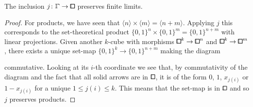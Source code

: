 \begin{lemma}\label{lem:bblox-bbox-pres-limits}
The inclusion $j\colon\bbGamma\to\bbox$ preserves finite limits.
\end{lemma}

\begin{proof}
For products, we have seen that $\langle n\rangle\times\langle m\rangle = \langle n+m\rangle$.
Applying $j$ this corresponds to the set-theoretical product $\{0,1\}^n\times\{0,1\}^m = \{0,1\}^{n+m}$
with linear projections.
Given another $k$-cube with morphisms ${\bbox}^k\to{\bbox}^n$ and ${\bbox}^k\to{\bbox}^m$,
there exists a unique set-map $\{0,1\}^k\to\{0,1\}^{n+m}$ making the diagram
\begin{center}
\end{center}
commutative.
Looking at its $i$-th coordinate we see that, by commutativity of the diagram
and the fact that all solid arrows are in $\bbox$, it is of the form $0$, $1$, $x_{j(i)}$ or $1-x_{j(i)}$ for a unique $1\leq j(i)\leq k$.
This means that the set-map is in $\bbox$ and so $j$ preserves products.


\end{proof}
